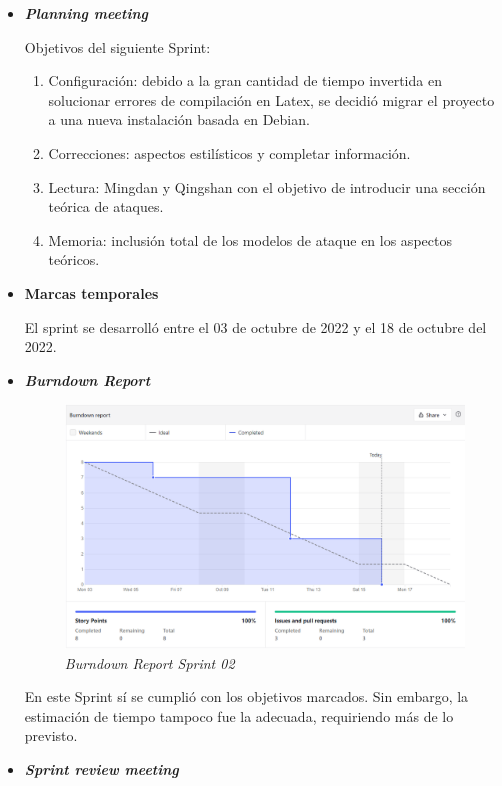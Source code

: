 \begin{itemize}
	\item \textbf{\textit{Planning meeting}}
	
	Objetivos del siguiente Sprint:
	
	\begin{enumerate}
		
		\item Configuración: debido a la gran cantidad de tiempo invertida en solucionar errores de compilación en Latex, se decidió migrar el proyecto a una nueva instalación basada en Debian.
		\item Correcciones: aspectos estilísticos y completar información.
		\item Lectura: Mingdan y Qingshan con el objetivo de introducir una sección teórica de ataques.
		\item Memoria: inclusión total de los modelos de ataque en los aspectos teóricos.
		
	\end{enumerate}
	
	\item \textbf{Marcas temporales}
	
	El sprint se desarrolló entre el 03 de octubre de 2022 y el 18 de octubre del 2022.
	
	\item \textbf{\textit{Burndown Report}}
	
	\begin{figure}[h]
		\caption{\textit{Burndown Report Sprint 02}}
		\centering
		\includegraphics[width=\textwidth]{../img/anexos/s02_bdr}
	\end{figure}
		
	En este Sprint sí se cumplió con los objetivos marcados. Sin embargo, la estimación de tiempo tampoco fue la adecuada, requiriendo más de lo previsto.
	
	\item \textbf{\textit{Sprint review meeting}}
	
\end{itemize}


